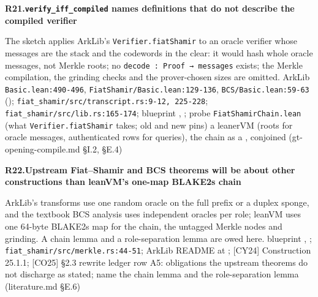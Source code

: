 \par\medskip\noindent\textbf{R21.}\enspace\textbf{\texttt{verify\_\allowbreak{}iff\_\allowbreak{}compiled} names definitions that do not describe the compiled verifier}\par\nopagebreak
{} The sketch applies ArkLib's \texttt{Verifier.\allowbreak{}fiat\allowbreak{}Shamir} to an oracle verifier whose messages are the stack and the codewords in the clear: it would hash whole oracle messages, not Merkle roots; no \texttt{decode :\allowbreak{} Proof → messages} exists; the Merkle compilation, the grinding checks and the prover-chosen sizes are omitted.
 ArkLib \texttt{Basic.\allowbreak{}lean:\allowbreak{}490-\allowbreak{}496}, \texttt{Fiat\allowbreak{}Shamir/\allowbreak{}Basic.\allowbreak{}lean:\allowbreak{}129-\allowbreak{}136}, \texttt{BCS/\allowbreak{}Basic.\allowbreak{}lean:\allowbreak{}59-\allowbreak{}63} (); \texttt{fiat\_\allowbreak{}shamir/\allowbreak{}src/\allowbreak{}transcript.\allowbreak{}rs:\allowbreak{}9-\allowbreak{}12,\allowbreak{} 225-\allowbreak{}228}; \texttt{fiat\_\allowbreak{}shamir/\allowbreak{}src/\allowbreak{}lib.\allowbreak{}rs:\allowbreak{}165-\allowbreak{}174}; blueprint , ; probe \texttt{Fiat\allowbreak{}Shamir\allowbreak{}Chain.\allowbreak{}lean} (what \texttt{Verifier.\allowbreak{}fiat\allowbreak{}Shamir} takes; old and new pins)
 a leanerVM  (roots for oracle messages, authenticated rows for queries), the chain as a ,  conjoined (gt-opening-compile.md §I.2, §E.4)

\par\medskip\noindent\textbf{R22.}\enspace\textbf{Upstream Fiat–Shamir and BCS theorems will be about other constructions than leanVM's one-map BLAKE2s chain}\par\nopagebreak
{} ArkLib's transforms use one random oracle on the full prefix or a duplex sponge, and the textbook BCS analysis uses independent oracles per role; leanVM uses one 64-byte BLAKE2s map for the chain, the untagged Merkle nodes and grinding. A chain lemma and a role-separation lemma are owed here.
 blueprint , ; \texttt{fiat\_\allowbreak{}shamir/\allowbreak{}src/\allowbreak{}merkle.\allowbreak{}rs:\allowbreak{}44-\allowbreak{}51}; ArkLib README at ; [CY24] Construction 25.1.1; [CO25] §2.3
 rewrite ledger row A5: obligations the upstream theorems do not discharge as stated; name the chain lemma and the role-separation lemma (literature.md §E.6)

